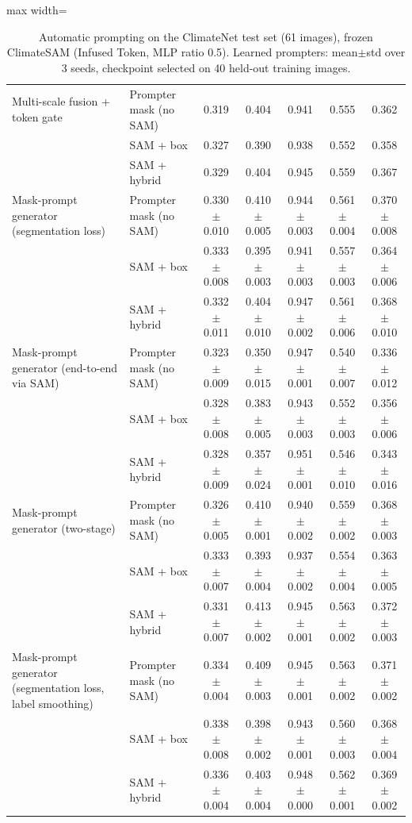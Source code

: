 \begin{table}[htbp]
\begin{adjustbox}{max width=\linewidth}
\begin{tabular}{llccccc}
\midrule
Multi-scale fusion + token gate & Prompter mask (no SAM) & 0.319 & 0.404 & 0.941 & 0.555 & 0.362 \\
 & SAM + box & 0.327 & 0.390 & 0.938 & 0.552 & 0.358 \\
 & SAM + hybrid & 0.329 & 0.404 & 0.945 & 0.559 & 0.367 \\
\midrule
Mask-prompt generator (segmentation loss) & Prompter mask (no SAM) & 0.330$\pm$0.010 & 0.410$\pm$0.005 & 0.944$\pm$0.003 & 0.561$\pm$0.004 & 0.370$\pm$0.008 \\
 & SAM + box & 0.333$\pm$0.008 & 0.395$\pm$0.003 & 0.941$\pm$0.003 & 0.557$\pm$0.003 & 0.364$\pm$0.006 \\
 & SAM + hybrid & 0.332$\pm$0.011 & 0.404$\pm$0.010 & 0.947$\pm$0.002 & 0.561$\pm$0.006 & 0.368$\pm$0.010 \\
\midrule
Mask-prompt generator (end-to-end via SAM) & Prompter mask (no SAM) & 0.323$\pm$0.009 & 0.350$\pm$0.015 & 0.947$\pm$0.001 & 0.540$\pm$0.007 & 0.336$\pm$0.012 \\
 & SAM + box & 0.328$\pm$0.008 & 0.383$\pm$0.005 & 0.943$\pm$0.003 & 0.552$\pm$0.003 & 0.356$\pm$0.006 \\
 & SAM + hybrid & 0.328$\pm$0.009 & 0.357$\pm$0.024 & 0.951$\pm$0.001 & 0.546$\pm$0.010 & 0.343$\pm$0.016 \\
\midrule
Mask-prompt generator (two-stage) & Prompter mask (no SAM) & 0.326$\pm$0.005 & 0.410$\pm$0.001 & 0.940$\pm$0.002 & 0.559$\pm$0.002 & 0.368$\pm$0.003 \\
 & SAM + box & 0.333$\pm$0.007 & 0.393$\pm$0.004 & 0.937$\pm$0.002 & 0.554$\pm$0.004 & 0.363$\pm$0.005 \\
 & SAM + hybrid & 0.331$\pm$0.007 & 0.413$\pm$0.002 & 0.945$\pm$0.001 & 0.563$\pm$0.002 & 0.372$\pm$0.003 \\
\midrule
Mask-prompt generator (segmentation loss, label smoothing) & Prompter mask (no SAM) & 0.334$\pm$0.004 & 0.409$\pm$0.003 & 0.945$\pm$0.001 & 0.563$\pm$0.002 & 0.371$\pm$0.002 \\
 & SAM + box & 0.338$\pm$0.008 & 0.398$\pm$0.002 & 0.943$\pm$0.001 & 0.560$\pm$0.003 & 0.368$\pm$0.004 \\
 & SAM + hybrid & 0.336$\pm$0.004 & 0.403$\pm$0.004 & 0.948$\pm$0.000 & 0.562$\pm$0.001 & 0.369$\pm$0.002 \\
\bottomrule
\end{tabular}
\end{adjustbox}
\caption{Automatic prompting on the ClimateNet test set (61 images), frozen ClimateSAM (Infused Token, MLP ratio 0.5). Learned prompters: mean$\pm$std over 3 seeds, checkpoint selected on 40 held-out training images.}
\label{tab:prompters_infused_mlp05}
\end{table}
